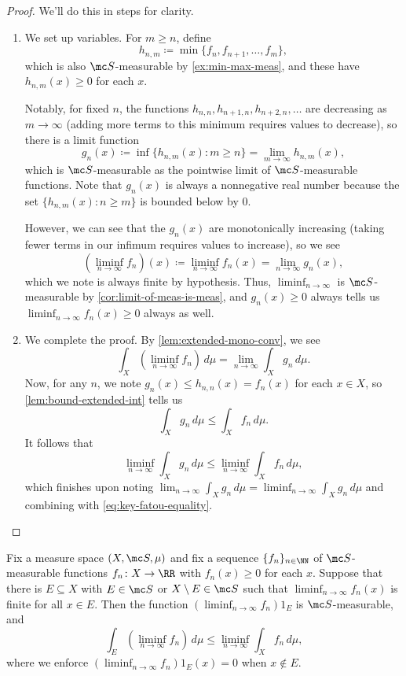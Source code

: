 \documentclass[../notes.tex]{subfiles}
\begin{document}
\begin{proof}
	We'll do this in steps for clarity.
	\begin{enumerate}
		\item We set up variables. For $m\ge n$, define
		\[h_{n,m}\coloneqq\min\{f_n,f_{n+1},\ldots,f_m\},\]
		which is also $\mc S$-measurable by \autoref{ex:min-max-meas}, and these have $h_{n,m}(x)\ge0$ for each $x$.
		
		Notably, for fixed $n$, the functions $h_{n,n},h_{n+1,n},h_{n+2,n},\ldots$ are decreasing as $m\to\infty$ (adding more terms to this minimum requires values to decrease), so there is a limit function
		\[g_n(x)\coloneqq\inf\{h_{n,m}(x):m\ge n\}=\lim_{m\to\infty}h_{n,m}(x),\]
		which is $\mc S$-measurable as the pointwise limit of $\mc S$-measurable functions. Note that $g_n(x)$ is always a nonnegative real number because the set $\{h_{n,m}(x):n\ge m\}$ is bounded below by $0$.
		
		However, we can see that the $g_n(x)$ are monotonically increasing (taking fewer terms in our infimum requires values to increase), so we see
		\[\left(\liminf_{n\to\infty}f_n\right)(x)\coloneqq\liminf_{n\to\infty}f_n(x)=\lim_{n\to\infty}g_n(x),\]
		which we note is always finite by hypothesis. Thus, $\liminf_{n\to\infty}$ is $\mc S$-measurable by \autoref{cor:limit-of-meas-is-meas}, and $g_n(x)\ge0$ always tells us $\liminf_{n\to\infty}f_n(x)\ge0$ always as well.

		\item We complete the proof. By \autoref{lem:extended-mono-conv}, we see
		\begin{equation}
			\int_X\left(\liminf_{n\to\infty} f_n\right)\,d\mu=\lim_{n\to\infty}\int_Xg_n\,d\mu. \label{eq:key-fatou-equality}
		\end{equation}
		Now, for any $n$, we note $g_n(x)\le h_{n,n}(x)=f_n(x)$ for each $x\in X$, so \autoref{lem:bound-extended-int} tells us
		\[\int_Xg_n\,d\mu\le\int_Xf_n\,d\mu.\]
		It follows that
		\[\liminf_{n\to\infty}\int_Xg_n\,d\mu\le\liminf_{n\to\infty}\int_Xf_n\,d\mu,\]
		which finishes upon noting $\lim_{n\to\infty}\int_Xg_n\,d\mu=\liminf_{n\to\infty}\int_Xg_n\,d\mu$ and combining with \autoref{eq:key-fatou-equality}.
		\qedhere
	\end{enumerate}
\end{proof}
\begin{corollary} %
	Fix a measure space $(X,\mc S,\mu)$ and fix a sequence $\{f_n\}_{n\in\NN}$ of $\mc S$-measurable functions $f_n\colon X\to\RR$ with $f_n(x)\ge0$ for each $x$. Suppose that there is $E\subseteq X$ with $E\in\mc S$ or $X\setminus E\in\mc S$ such that $\liminf_{n\to\infty}f_n(x)$ is finite for all $x\in E$. Then the function $\left(\liminf_{n\to\infty}f_n\right)1_E$ is $\mc S$-measurable, and
	\[\int_E\left(\liminf_{n\to\infty} f_n\right)\,d\mu\le\liminf_{n\to\infty}\int_Xf_n\,d\mu,\]
	where we enforce $\left(\liminf_{n\to\infty}f_n\right)1_E(x)=0$ when $x\notin E$.
\end{corollary}
\end{document}
